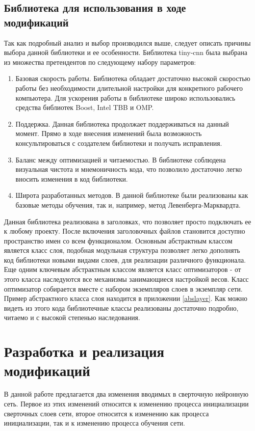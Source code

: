 \documentclass[utf8,usehyperref,14pt]{G7-32}
\begin{document}
\section{Библиотека для использования в ходе модификаций}
Так как подробный анализ и выбор производился выше, следует описать причины выбора данной библиотеки и ее особенности.
Библиотека tiny-cnn  была выбрана из множества претендентов по следующему набору параметров:
\begin{enumerate}
\item Базовая скорость работы. Библиотека обладает достаточно высокой скоростью работы без необходимости длительной настройки для конкретного рабочего компьютера. Для ускорения работы в библиотеке широко использовались средства библиотек Boost,  Intel TBB и OMP.
\item Поддержка. Данная библиотека продолжает поддерживаться на данный момент. Прямо в ходе внесения изменений была возможность консультироваться с создателем библиотеки и получать исправления.
\item Баланс между оптимизацией и читаемостью. В библиотеке соблюдена визуальная чистота и мнемоничность кода, что позволило достаточно легко вносить изменения в код библиотеки.
\item Широта разработанных методов. В данной библиотеке были реализованы как базовые методы обучения, так и, например, метод Левенберга-Марквардта. 
\end{enumerate}

Данная библиотека реализована в заголовках, что позволяет просто подключать ее к любому проекту. После включения заголовочных файлов становится доступно пространство имен со всем функционалом. Основным абстрактным классом является класс слоя, подобная модульная структура позволяет легко дополнять код библиотеки новыми видами слоев, для реализации различного функционала. Еще одним ключевым абстрактным классом является класс оптимизаторов - от этого класса наследуются все механизмы занимающиеся настройкой весов. Класс оптимизатор собирается вместе с набором экземпляров слоев в экземпляр сети. Пример абстрактного класса слоя находится в приложении \ref{abslayer}. Как можно видеть из этого кода библиотечные классы реализованы достаточно подробно, читаемо и с высокой степенью наследования.

\chapter{Разработка и реализация модификаций}
В данной работе предлагается два изменения вводимых в сверточную нейронную сеть. Первое из этих изменений относится к изменению процесса инициализации сверточных слоев сети, второе относится к изменению как процесса инициализации, так и к изменению процесса обучения сети.
\end{document}
